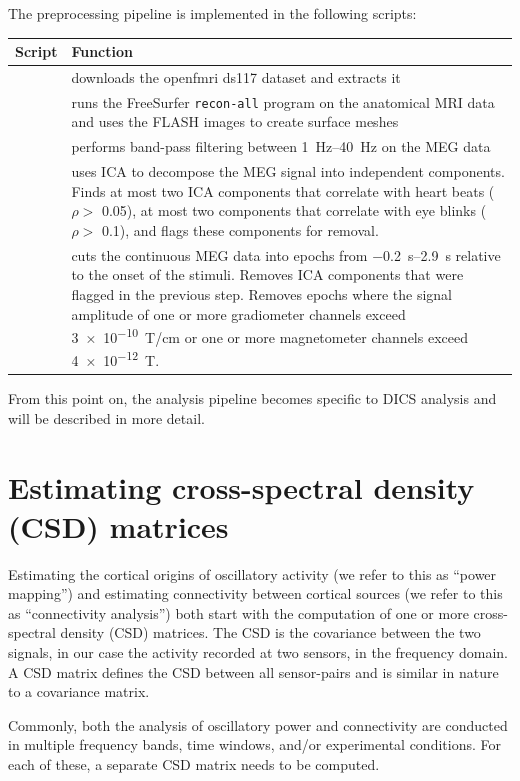 \documentclass[utf8]{frontiersSCNS}
\begin{document}
The preprocessing pipeline is implemented in the following scripts:

\begin{tabular}{lp{13cm}}
    Script & Function \\
    \hline
    \verb#00_fetch_data.py# & downloads the openfmri ds117 dataset and extracts it \\
    \verb#01_anatomy.py# & runs the FreeSurfer \verb#recon-all# program on the anatomical MRI data and uses the FLASH images to create surface meshes \\
    \verb#02_filter.py# & performs band-pass filtering between \SIrange{1}{40}{\hertz} on the MEG data \\
    \verb#03_ica.py# & uses ICA to decompose the MEG signal into independent components. Finds at most two ICA components that correlate with heart beats ($\rho >$ 0.05), at most two components that correlate with eye blinks ($\rho >$ 0.1), and flags these components for removal. \\
    \verb#04_epochs.py# & cuts the continuous MEG data into epochs from \SIrange{-0.2}{2.9}{\second} relative to the onset of the stimuli. Removes ICA components that were flagged in the previous step. Removes epochs where the signal amplitude of one or more gradiometer channels exceed \SI{3e-10}{\tesla/\centi\meter} or one or more magnetometer channels exceed \SI{4e-12}{\tesla}.
\end{tabular}

From this point on, the analysis pipeline becomes specific to DICS analysis and will be described in more detail.


\section{Estimating cross-spectral density (CSD) matrices}\label{csd}

Estimating the cortical origins of oscillatory activity (we refer to this as ``power mapping'') and estimating connectivity between cortical sources (we refer to this as ``connectivity analysis'') both start with the computation of one or more cross-spectral density (CSD) matrices.
The CSD is the covariance between the two signals, in our case the activity recorded at two sensors, in the frequency domain.
A CSD matrix defines the CSD between all sensor-pairs and is similar in nature to a covariance matrix.

Commonly, both the analysis of oscillatory power and connectivity are conducted in multiple frequency bands, time windows, and/or experimental conditions.
For each of these, a separate CSD matrix needs to be computed.
\end{document}

